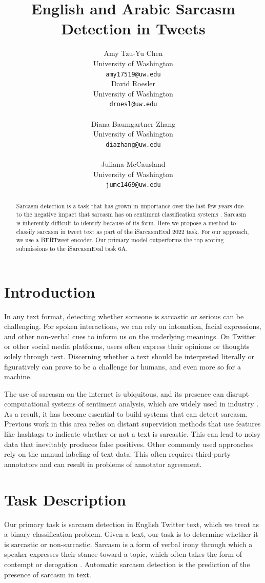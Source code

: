 \documentclass[11pt]{article}
\title{English and Arabic Sarcasm Detection in Tweets}
\author{Amy Tzu-Yu Chen \\
  University of Washington \\
  \texttt{amy17519@uw.edu} \\\And
  {David Roesler \\
  University of Washington \\
  \texttt{droesl@uw.edu} \\} \\\AND
  {Diana Baumgartner-Zhang \\
  University of Washington \\
  \texttt{diazhang@uw.edu} \\} \\\And
  Juliana McCausland \\
  University of Washington \\
  \texttt{jumc1469@uw.edu} \\}
\begin{document}
\maketitle
\begin{abstract}


Sarcasm detection is a task that has grown in importance over the last few years due to the negative impact that sarcasm has on sentiment classification systems \citealp{Liu2010SentimentAA}. Sarcasm is inherently difficult to identify because of its form. Here we propose a method to classify sarcasm in tweet text as part of the iSarcasmEval 2022 task. For our approach, we use a BERTweet encoder. Our primary model outperforms the top scoring submissions to the iSarcasmEval task 6A.
\end{abstract}

\section{Introduction}

In any text format, detecting whether someone is sarcastic or serious can be challenging. For spoken interactions, we can rely on intonation, facial expressions, and other non-verbal cues to inform us on the underlying meanings. On Twitter or other social media platforms, users often express their opinions or thoughts solely through text. Discerning whether a text should be interpreted literally or figuratively can prove to be a challenge for humans, and even more so for a machine.

The use of sarcasm on the internet is ubiquitous, and its presence can disrupt computational systems of sentiment analysis, which are widely used in industry \citealp{Liu2010SentimentAA}. As a result, it has become essential to build systems that can detect sarcasm. Previous work in this area relies on distant supervision methods that use features like hashtags to indicate whether or not a text is sarcastic. This can lead to noisy data that inevitably produces false positives. Other commonly used approaches rely on the manual labeling of text data. This often requires third-party annotators and can result in problems of annotator agreement.

\section{Task Description}

Our primary task is sarcasm detection in English Twitter text, which we treat as a binary classification problem. Given a text, our task is to determine whether it is sarcastic or non-sarcastic. Sarcasm is a form of verbal irony through which a speaker expresses their stance toward a topic, which often takes the form of contempt or derogation \citealp{WILSON20061722}. Automatic sarcasm detection \citealp{joshi:automatic} is the prediction of the presence of sarcasm in text. 
\end{document}
